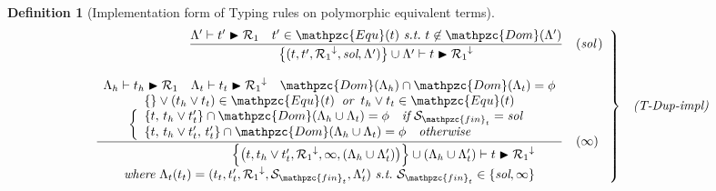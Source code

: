 \documentclass[12pt]{article}
\newtheorem{Definition}{Definition}[section]
\begin{document}
\begin{Definition}[Implementation form of Typing rules on
    polymorphic equivalent terms]
\begin{displaymath}
\begin{array}{c}
      \begin{array}{rl}
        \left. \begin{array}{rl}
          \dfrac{
            \Lambda' \vdash t' \blacktriangleright \mathcal{R}_1 \quad
             t' \in \mathpzc{Equ}(t)\ \text{\it s.t.}\ t \not\in
              \mathpzc{Dom}(\Lambda')
          }{
            \bigl\{(t, t', {\mathcal{R}_1}^\downarrow, \text{\it sol},
             \Lambda') \bigr\} \cup \Lambda' \vdash
              t \blacktriangleright {\mathcal{R}_1}^\downarrow
          }  &  (\text{\it sol}\,)  \\
          \\
          
          \dfrac{
            \begin{array}{c}
              \Lambda_h \vdash t_h \blacktriangleright \mathcal{R}_1
               \quad \Lambda_t \vdash t_t \blacktriangleright
                {\mathcal{R}_1}^\downarrow
                 \quad \mathpzc{Dom}(\Lambda_h) \cap \mathpzc{Dom}(\Lambda_t)
                  = \phi  \\
              \{\} \vee (t_h \vee t_t) \in \mathpzc{Equ}(t)\;\;
               \text{\it or}\;\; t_h \vee t_t \in \mathpzc{Equ}(t)  \\
              \left\{\begin{array}{l}
                \{t,\, t_h \vee t'_t \} \cap \mathpzc{Dom}(
                 \Lambda_h \cup \Lambda_t) = \phi\quad \text{\it if}\
                  \mathcal{S}_{\mathpzc{fin}_t} = \text{\it sol}  \\
                \{t,\, t_h \vee t'_t,\, t'_t \} \cap \mathpzc{Dom}(
                 \Lambda_h \cup \Lambda_t) = \phi\quad \text{\it otherwise}
              \end{array}\right.
            \end{array}
          }{
            \begin{array}{r}
              \Bigl\{\bigl(t, t_h \vee t_t', {\mathcal{R}_1}^\downarrow,
               \infty, (\Lambda_h \cup \Lambda_t') \bigr) \Bigr\} \cup
                (\Lambda_h \cup \Lambda_t') \vdash
                 t \blacktriangleright {\mathcal{R}_1}^\downarrow  \\
              \text{\it where}\
               \Lambda_t(t_t) = (t_t, t_t', {\mathcal{R}_1}^\downarrow,
                \mathcal{S}_{\mathpzc{fin}_t}, \Lambda_t')\ \text{\it s.t.}\
                 \mathcal{S}_{\mathpzc{fin}_t} \in \{\text{\it sol}, \infty\}
            \end{array}
          }  &  (\infty)
        \end{array} \right\}  &  \text{\it (T-Dup-impl)}
      \end{array}  \\
      \\
      

\end{array}
\end{displaymath}
\end{Definition}
\end{document}
